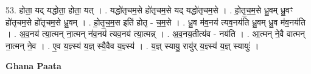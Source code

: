 \documentclass[17pt]{extarticle}
\begin{document}
53. होता॒ यद् यद्धोता॒ होता॒ यत् । . यद्धो॑तृचम॒से हो॑तृचम॒से यद् यद्धो॑तृचम॒से । . हो॒तृ॒च॒म॒से ध्रु॒वम् ध्रु॒वꣳ हो॑तृचम॒से हो॑तृचम॒से ध्रु॒वम् । . हो॒तृ॒च॒म॒स इति॑ होतृ - च॒म॒से । . ध्रु॒व म॑व॒नय॑ त्यव॒नय॑ति ध्रु॒वम् ध्रु॒व म॑व॒नय॑ति । . अ॒व॒नय॑ त्या॒त्मन् ना॒त्मन् न॑व॒नय॑ त्यव॒नय॑ त्या॒त्मन्न् । . अ॒व॒नय॒तीत्य॑व - नय॑ति । . आ॒त्मन् ने॒वै वात्मन् ना॒त्मन् ने॒व । . ए॒व य॒ज्ञ्स्य॑ य॒ज्ञ् स्यै॒वैव य॒ज्ञ्स्य॑ । . य॒ज्ञ् स्यायु॒ रायु॑र् य॒ज्ञ्स्य॑ य॒ज्ञ् स्यायुः॑ । \newline

\textbf{Ghana Paata } \newline
\end{document}
